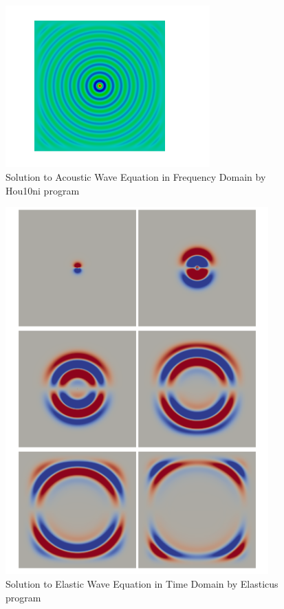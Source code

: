 \begin{figure}[ht]
	\centering
	\includegraphics[width=0.7\textwidth]{Images/Water-Frequency.png}
	\caption{Solution to Acoustic Wave Equation in Frequency Domain by Hou10ni program}
	\label{fig:Water-Frequency}
\end{figure}


\begin{figure}
	\centering
	\includegraphics[width=0.9\textwidth]{Images/time.png}
	\caption{Solution to Elastic Wave Equation in Time Domain by Elasticus program}
	\label{fig:Water-Time}
\end{figure}


